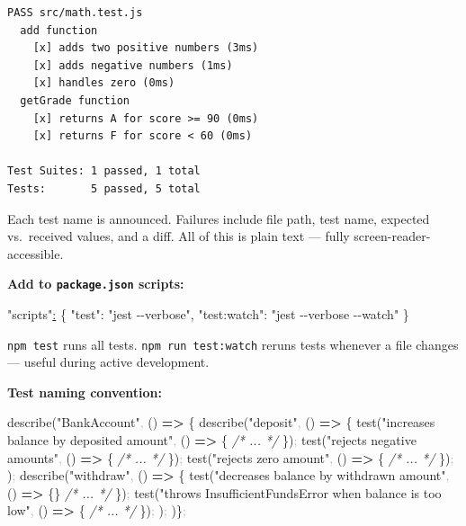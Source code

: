 \documentclass[
  justified,
  openright,
]{tufte-book}
\newcommand{\KeywordTok}[1]{\textcolor{CodeKeyword}{\textbf{#1}}}  %
\newcommand{\StringTok}[1]{\textcolor{CodeString}{#1}}              %
\newcommand{\CommentTok}[1]{\textcolor{CodeComment}{\textit{#1}}}  %
\newcommand{\CodeFuncTok}[1]{\textcolor{CodeKeyword}{#1}}           %
\newcommand{\CodeTypeTok}[1]{\textcolor{CodeType}{#1}}              %
\newcommand{\OperatorTok}[1]{\textcolor{DarkGray}{#1}}              %
\newcommand{\ErrorTok}[1]{\textcolor{CodeError}{\underline{#1}}}    %
\newenvironment{Shaded}{%
  \begin{mdframed}[style=TufteCode]%
}{%
  \end{mdframed}%
}
\begin{document}
\begin{verbatim}
PASS src/math.test.js
  add function
    [x] adds two positive numbers (3ms)
    [x] adds negative numbers (1ms)
    [x] handles zero (0ms)
  getGrade function
    [x] returns A for score >= 90 (0ms)
    [x] returns F for score < 60 (0ms)

Test Suites: 1 passed, 1 total
Tests:       5 passed, 5 total
\end{verbatim}

Each test name is announced. Failures include file path, test name,
expected vs.~received values, and a diff. All of this is plain text ---
fully screen-reader-accessible.

\textbf{Add to \texttt{package.json} scripts:}

\begin{Shaded}
\begin{Highlighting}[]
\StringTok{"scripts"}\ErrorTok{:} \CodeFuncTok{\{}
    \CodeTypeTok{"test"}\CodeFuncTok{:} \StringTok{"jest {-}{-}verbose"}\CodeFuncTok{,}
    \CodeTypeTok{"test:watch"}\CodeFuncTok{:} \StringTok{"jest {-}{-}verbose {-}{-}watch"}
\CodeFuncTok{\}}
\end{Highlighting}
\end{Shaded}

\texttt{npm\ test} runs all tests. \texttt{npm\ run\ test:watch} reruns
tests whenever a file changes --- useful during active development.

\textbf{Test naming convention:}

\begin{Shaded}
\begin{Highlighting}[]
\CodeFuncTok{describe}(\StringTok{"BankAccount"}\OperatorTok{,} () \KeywordTok{=\textgreater{}} \{
  \CodeFuncTok{describe}(\StringTok{"deposit"}\OperatorTok{,} () \KeywordTok{=\textgreater{}} \{
    \CodeFuncTok{test}(\StringTok{"increases balance by deposited amount"}\OperatorTok{,} () \KeywordTok{=\textgreater{}} \{
      \CommentTok{/* ... */}
    \})\OperatorTok{;}
    \CodeFuncTok{test}(\StringTok{"rejects negative amounts"}\OperatorTok{,} () \KeywordTok{=\textgreater{}} \{
      \CommentTok{/* ... */}
    \})\OperatorTok{;}
    \CodeFuncTok{test}(\StringTok{"rejects zero amount"}\OperatorTok{,} () \KeywordTok{=\textgreater{}} \{
      \CommentTok{/* ... */}
    \})\OperatorTok{;}
  )\OperatorTok{;}
  \CodeFuncTok{describe}(\StringTok{"withdraw"}\OperatorTok{,} () \KeywordTok{=\textgreater{}} \{
    \CodeFuncTok{test}(\StringTok{"decreases balance by withdrawn amount"}\OperatorTok{,} () \KeywordTok{=\textgreater{}} \{\}
      \CommentTok{/* ... */}
    \})\OperatorTok{;}
    \CodeFuncTok{test}(\StringTok{"throws InsufficientFundsError when balance is too low"}\OperatorTok{,} () \KeywordTok{=\textgreater{}} \{
      \CommentTok{/* ... */}
    \})\OperatorTok{;}
  )\OperatorTok{;}
)\}\OperatorTok{;}
\end{Highlighting}
\end{Shaded}
\end{document}
